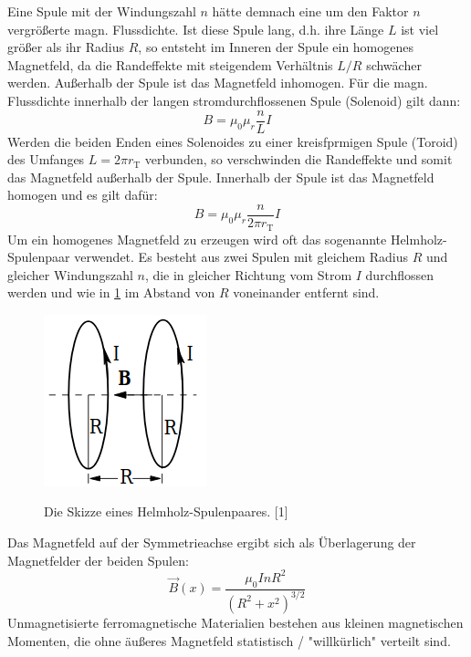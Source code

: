 \documentclass[titlepage = firstcover]{scrartcl}
\begin{document}
      \FloatBarrier
      Eine Spule mit der Windungszahl $n$ hätte demnach eine um den Faktor $n$ vergrößerte magn. Flussdichte. Ist diese Spule lang, d.h. ihre Länge $L$ ist
      viel größer als ihr Radius $R$, so entsteht im Inneren der Spule ein homogenes Magnetfeld, da die Randeffekte mit steigendem Verhältnis $L/R$ schwächer
      werden. Außerhalb der Spule ist das Magnetfeld inhomogen. Für die magn. Flussdichte innerhalb der langen stromdurchflossenen Spule (Solenoid) gilt dann:
      \begin{equation}
        B = \mu_0 \mu_r \frac{n}{L} I
      \end{equation}
      Werden die beiden Enden eines Solenoides zu einer kreisfprmigen Spule (Toroid) des Umfanges $L = 2 \pi r_\text{T}$ verbunden, so verschwinden die Randeffekte und somit das Magnetfeld
      außerhalb der Spule. Innerhalb der Spule ist das Magnetfeld homogen und es gilt dafür:
      \begin{equation}
        B = \mu_0 \mu_r \frac{n}{2 \pi r_\text{T}} I
      \end{equation}
      Um ein homogenes Magnetfeld zu erzeugen wird oft das sogenannte Helmholz-Spulenpaar verwendet. Es besteht aus zwei Spulen mit gleichem Radius $R$ und
      gleicher Windungszahl $n$, die in gleicher Richtung vom Strom $I$ durchflossen werden und wie in \ref{fig:helmholz} im Abstand von $R$ voneinander entfernt sind.
      \begin{figure}[h]
        \centering
        \caption{Die Skizze eines Helmholz-Spulenpaares. [1]}
        \includegraphics[width = 0.25\linewidth]{Helmholzspulenpaar.png}
        \label{fig:helmholz}
      \end{figure}
      \FloatBarrier
      \noindent
      Das Magnetfeld auf der Symmetrieachse ergibt sich als Überlagerung der Magnetfelder der beiden Spulen:
      \begin{equation}
        \vec{B}(x) = \frac{\mu_0 I n R^2}{(R^2 + x^2)^{3/2}}
      \end{equation}
      Unmagnetisierte ferromagnetische Materialien bestehen aus kleinen magnetischen Momenten, die ohne äußeres Magnetfeld statistisch / "willkürlich" verteilt sind.
\end{document}
